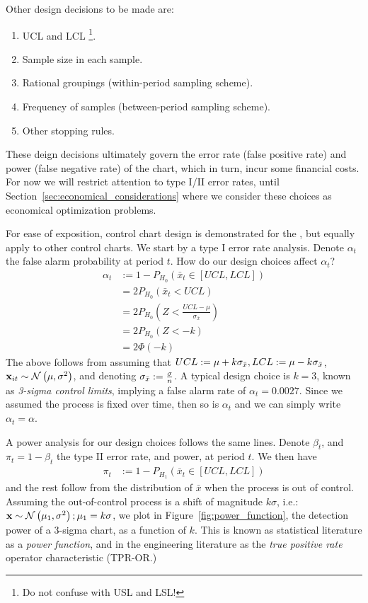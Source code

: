 Other design decisions to be made are:
\begin{enumerate}
\item UCL and LCL \footnote{Do not confuse with USL and LSL!}.
\item Sample size in each sample.
\item Rational groupings (within-period sampling scheme).
\item Frequency of samples (between-period sampling scheme). 
\item Other stopping rules.
\end{enumerate}
These deign decisions ultimately govern the error rate (false positive rate) and power (false negative rate) of the chart, which in turn, incur some financial costs. 
For now we will restrict attention to type I/II error rates, until Section~\ref{sec:economical_considerations} where we consider these choices as economical optimization problems.

For ease of exposition, control chart design is demonstrated for the \barxChart, but equally apply to other control charts.
We start by a type I error rate analysis. 
Denote $\alpha_t$ the false alarm probability at period $t$.
How do our design choices affect $\alpha_t$?
\begin{align}
	\alpha_t &:= 1-P_{H_0}(\bar{x}_t \in [UCL,LCL]) \\
	&= 2 P_{H_0}(\bar{x}_t<UCL) \\
	&= 2 P_{H_0}(Z<\frac{UCL-\mu}{\sigma_{\bar{x}}}) \\
	&= 2 P_{H_0}(Z < -k) \\
	&= 2 \Phi(-k)
\end{align}
The above follows from assuming that $UCL:=\mu + k \sigma_{\bar{x}}, LCL:= \mu - k \sigma_{\bar{x}}$, $\mathbf{x}_{it}\sim \mathcal{N}\left(\mu,\sigma^2\right)$, and denoting $\sigma_{\bar{x}}:= \frac{\sigma}{n}$.
A typical design choice is $k=3$, known as \emph{3-sigma control limits}, implying a false alarm rate of $\alpha_t=0.0027$.
Since we assumed the process is fixed over time, then so is $\alpha_t$ and we can simply write $\alpha_t=\alpha$.

A power analysis for our design choices follows the same lines.
Denote $\beta_t$, and $\pi_t=1-\beta_t$ the type II error rate, and power, at period $t$.
We then have
\begin{align}
	\pi_t &:= 1-P_{H_1}(\bar{x}_t \in [UCL,LCL])
\end{align}
and the rest follow from the distribution of $\bar{x}$ when the process is out of control.
Assuming the out-of-control process is a shift of magnitude $k \sigma$, i.e.: $\mathbf{x} \sim \mathcal{N}\left(\mu_1,\sigma^2\right); \mu_1=k \sigma$, we plot in Figure~\ref{fig:power_function}, the detection power of a 3-sigma chart, as a function of $k$. 
This is known as statistical literature as a \emph{power function}, and in the engineering literature as the \emph{true positive rate} operator characteristic (TPR-OR.)


